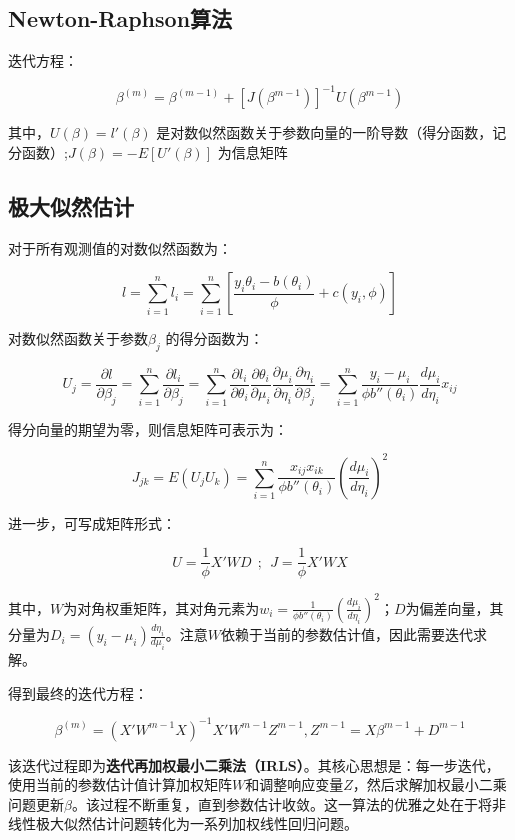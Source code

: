 \documentclass[
]{book}
\begin{document}
\subsection{Newton-Raphson算法}\label{newton-raphsonux7b97ux6cd5}

迭代方程：

\[
\beta^{(m)}=\beta^{(m-1)}+[J(\beta^{m-1})]^{-1}U(\beta^{m-1})
\]

其中，\(U(\beta)=l'(\beta)\) 是对数似然函数关于参数向量的一阶导数（得分函数，记分函数）;\(J(\beta)=-E[U'(\beta)]\) 为信息矩阵

\subsection{极大似然估计}\label{ux6781ux5927ux4f3cux7136ux4f30ux8ba1}

对于所有观测值的对数似然函数为：

\[
l=\sum_{i=1}^nl_i=\sum_{i=1}^n[\frac{y_i\theta_i-b(\theta_i)}{\phi}+c(y_i,\phi)]
\]

对数似然函数关于参数\(\beta_j\) 的得分函数为：

\[
U_j=\frac{\partial l}{\partial \beta_j}=\sum_{i=1}^n\frac{\partial l_i}{\partial\beta_j}=\sum_{i=1}^n\frac{\partial l_i}{\partial\theta_i}\frac{\partial\theta_i}{\partial\mu_i}\frac{\partial\mu_i}{\partial \eta_i}\frac{\partial\eta_i}{\partial\beta_j}=\sum_{i=1}^n\frac{y_i-\mu_i}{\phi b''(\theta_i)}\frac{d\mu_i}{d\eta_i}x_{ij}
\]

得分向量的期望为零，则信息矩阵可表示为：

\[
J_{jk}=E(U_jU_k)=\sum_{i=1}^n\frac{x_{ij}x_{ik}}{\phi b''(\theta_i)}(\frac{d\mu_i}{d\eta_i})^2
\]

进一步，可写成矩阵形式：

\[
U=\frac{1}{\phi}X'WD\ \ ;\ \ J=\frac{1}{\phi}X'WX
\]

其中，\(W\)为对角权重矩阵，其对角元素为\(w_i = \frac{1}{\phi b''(\theta_i)} \left(\frac{d\mu_i}{d\eta_i}\right)^2\)；\(D\)为偏差向量，其分量为\(D_i = (y_i - \mu_i) \frac{d\eta_i}{d\mu_i}\)。注意\(W\)依赖于当前的参数估计值，因此需要迭代求解。

得到最终的迭代方程：

\[
\beta^{(m)}=(X'W^{m-1}X)^{-1}X'W^{m-1}Z^{m-1},Z^{m-1}=X\beta^{m-1}+D^{m-1}
\]

该迭代过程即为\textbf{迭代再加权最小二乘法（IRLS）}。其核心思想是：每一步迭代，使用当前的参数估计值计算加权矩阵\(W\)和调整响应变量\(Z\)，然后求解加权最小二乘问题更新\(\beta\)。该过程不断重复，直到参数估计收敛。这一算法的优雅之处在于将非线性极大似然估计问题转化为一系列加权线性回归问题。
\end{document}
